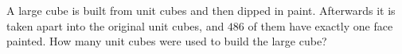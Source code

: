 A large cube is built from unit cubes and then dipped in paint. Afterwards it is taken apart into the original unit cubes, and $486$ of them have exactly one face painted. How many unit cubes were used to build the large cube?

